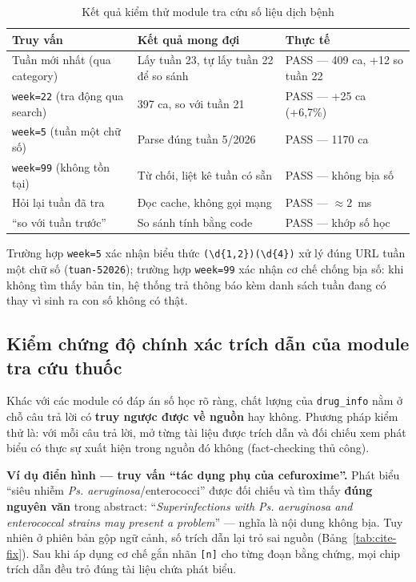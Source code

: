 \documentclass[a4paper,13pt,3p,twoside,openany]{report}
\theoremstyle{definition}
\theoremstyle{remark}
\theoremstyle{definition}
\let\ORIGsubsection\subsection
\renewcommand{\subsection}{\needspace{3\baselineskip}\ORIGsubsection}
\begin{document}
\begin{table}[H]
\centering
\begin{tabular}{|p{4.2cm}|p{4.3cm}|p{4.3cm}|}
\hline
\textbf{Truy vấn} & \textbf{Kết quả mong đợi} & \textbf{Thực tế} \\
\hline
Tuần mới nhất (qua category) & Lấy tuần 23, tự lấy tuần 22 để so sánh & PASS --- 409 ca, +12 so tuần 22 \\
\hline
\texttt{week=22} (tra động qua search) & 397 ca, so với tuần 21 & PASS --- +25 ca (+6,7\%) \\
\hline
\texttt{week=5} (tuần một chữ số) & Parse đúng tuần 5/2026 & PASS --- 1170 ca \\
\hline
\texttt{week=99} (không tồn tại) & Từ chối, liệt kê tuần có sẵn & PASS --- không bịa số \\
\hline
Hỏi lại tuần đã tra & Đọc cache, không gọi mạng & PASS --- $\approx 2$~ms \\
\hline
``so với tuần trước'' & So sánh tính bằng code & PASS --- khớp số học \\
\hline
\end{tabular}
\caption{Kết quả kiểm thử module tra cứu số liệu dịch bệnh}
\label{tab:outbreak-test}
\end{table}

Trường hợp \texttt{week=5} xác nhận biểu thức \texttt{(\textbackslash d\{1,2\})(\textbackslash d\{4\})} xử lý đúng URL tuần một chữ số (\texttt{tuan-52026}); trường hợp \texttt{week=99} xác nhận cơ chế chống bịa số: khi không tìm thấy bản tin, hệ thống trả thông báo kèm danh sách tuần đang có thay vì sinh ra con số không có thật.

\subsection{Kiểm chứng độ chính xác trích dẫn của module tra cứu thuốc}

Khác với các module có đáp án số học rõ ràng, chất lượng của \texttt{drug\_info} nằm ở chỗ câu trả lời có \textbf{truy ngược được về nguồn} hay không. Phương pháp kiểm thử là: với mỗi câu trả lời, mở từng tài liệu được trích dẫn và đối chiếu xem phát biểu có thực sự xuất hiện trong nguồn đó không (fact-checking thủ công).

\textbf{Ví dụ điển hình --- truy vấn ``tác dụng phụ của cefuroxime''.} Phát biểu ``siêu nhiễm \textit{Ps. aeruginosa}/enterococci'' được đối chiếu và tìm thấy \textbf{đúng nguyên văn} trong abstract: ``\textit{Superinfections with Ps. aeruginosa and enterococcal strains may present a problem}'' --- nghĩa là nội dung không bịa. Tuy nhiên ở phiên bản gộp ngữ cảnh, số trích dẫn lại trỏ sai nguồn (Bảng~\ref{tab:cite-fix}). Sau khi áp dụng cơ chế gắn nhãn \texttt{[n]} cho từng đoạn bằng chứng, mọi chip trích dẫn đều trỏ đúng tài liệu chứa phát biểu.
\end{document}
